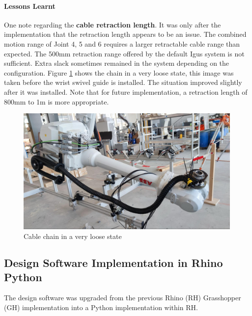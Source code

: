 \paragraph{Lessons Learnt}

One note regarding the \textbf{cable retraction length}. It was only after the implementation that the retraction length appears to be an issue. The combined motion range of Joint 4, 5 and 6 requires a larger retractable cable range than expected. The 500mm retraction range offered by the default Igus system is not sufficient. Extra slack sometimes remained in the system depending on the configuration. Figure \ref{fig:cable-chain-in-a-very-loose-state} shows the chain in a very loose state, this image was taken before the wrist swivel guide is installed. The situation improved slightly after it was installed. Note that for future implementation, a retraction length of 800mm to 1m is more appropriate.

\begin{figure}[!h]
    \centering
    \includegraphics[width=0.99\textwidth]{images/6a/img11.jpg}
    \caption{Cable chain in a very loose state}
    \label{fig:cable-chain-in-a-very-loose-state}
\end{figure}


\subsection{Design Software Implementation in Rhino Python}
\label{subsection:exploration-3-design-software-implementation-in-rhino-python}

The design software was upgraded from the previous Rhino (RH) Grasshopper (GH) implementation  into a Python implementation within RH.

